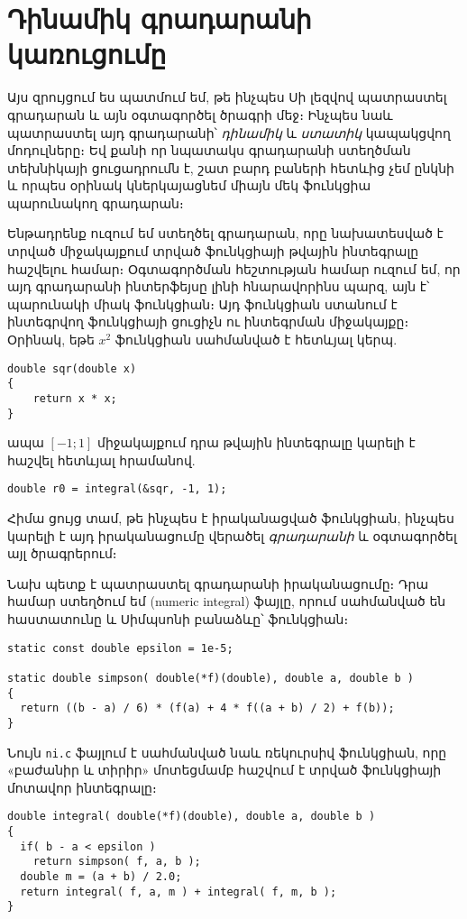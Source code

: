 \chapter{Դինամիկ գրադարանի կառուցումը}

Այս զրույցում ես պատմում եմ, թե ինչպես Սի լեզվով պատրաստել
գրադարան և այն օգտագործել ծրագրի մեջ։ Ինչպես նաև պատրաստել
այդ գրադարանի՝ \emph{դինամիկ} և \emph{ստատիկ} կապակցվող
մոդուլները։ Եվ քանի որ նպատակս գրադարանի ստեղծման տեխնիկայի
ցուցադրումն է, շատ բարդ բաների հետևից չեմ ընկնի և որպես
օրինակ կներկայացնեմ միայն մեկ ֆունկցիա պարունակող գրադարան։

Ենթադրենք ուզում եմ ստեղծել գրադարան, որը նախատեսված է տրված
միջակայքում տրված ֆունկցիայի թվային ինտեգրալը հաշվելու համար։
Օգտագործման հեշտության համար ուզում եմ, որ այդ գրադարանի
ինտերֆեյսը լինի հնարավորինս պարզ, այն է՝ պարունակի միակ
 ֆունկցիան։ Այդ ֆունկցիան ստանում է ինտեգրվող
ֆունկցիայի ցուցիչն ու ինտեգրման միջակայքը։ Օրինակ, եթե \(x^2\)
ֆունկցիան սահմանված է հետևյալ կերպ.

\begin{Verbatim}
double sqr(double x)
{
    return x * x;
}
\end{Verbatim}

ապա \([-1;1]\) միջակայքում դրա թվային ինտեգրալը կարելի է հաշվել
հետևյալ հրամանով.

\begin{Verbatim}
double r0 = integral(&sqr, -1, 1);
\end{Verbatim}

Հիմա ցույց տամ, թե ինչպես է իրականացված 
ֆունկցիան, ինչպես կարելի է այդ իրականացումը վերածել
\emph{գրադարանի} և օգտագործել այլ ծրագրերում։

Նախ պետք է պատրաստել գրադարանի իրականացումը։ Դրա համար ստեղծում
եմ  (numeric integral) ֆայլը, որում սահմանված են
 հաստատունը և Սիմպսոնի բանաձևը՝ 
ֆունկցիան։

\begin{Verbatim}
static const double epsilon = 1e-5;

static double simpson( double(*f)(double), double a, double b )
{
  return ((b - a) / 6) * (f(a) + 4 * f((a + b) / 2) + f(b));
}
\end{Verbatim}

Նույն \texttt{ni.c} ֆայլում է սահմանված նաև 
ռեկուրսիվ ֆունկցիան, որը «բաժանիր և տիրիր» մոտեցմամբ հաշվում
է տրված ֆունկցիայի մոտավոր ինտեգրալը։

\begin{Verbatim}
double integral( double(*f)(double), double a, double b )
{
  if( b - a < epsilon )
    return simpson( f, a, b );
  double m = (a + b) / 2.0;
  return integral( f, a, m ) + integral( f, m, b );
}
\end{Verbatim}


